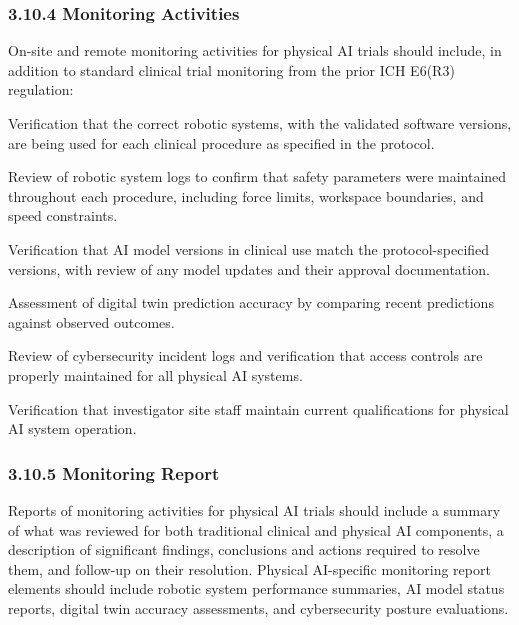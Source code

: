\subsubsection{3.10.4 Monitoring Activities}

On-site and remote monitoring activities for physical AI trials should include, in addition to standard clinical trial monitoring from the prior ICH E6(R3) regulation:

\begin{description}[leftmargin=2.5cm,style=sameline]

\item[(a)] Verification that the correct robotic systems, with the validated software versions, are being used for each clinical procedure as specified in the protocol.

\item[(b)] Review of robotic system logs to confirm that safety parameters were maintained throughout each procedure, including force limits, workspace boundaries, and speed constraints.

\item[(c)] Verification that AI model versions in clinical use match the protocol-specified versions, with review of any model updates and their approval documentation.

\item[(d)] Assessment of digital twin prediction accuracy by comparing recent predictions against observed outcomes.

\item[(e)] Review of cybersecurity incident logs and verification that access controls are properly maintained for all physical AI systems.

\item[(f)] Verification that investigator site staff maintain current qualifications for physical AI system operation.

\end{description}

\subsubsection{3.10.5 Monitoring Report}

Reports of monitoring activities for physical AI trials should include a summary of what was reviewed for both traditional clinical and physical AI components, a description of significant findings, conclusions and actions required to resolve them, and follow-up on their resolution. Physical AI-specific monitoring report elements should include robotic system performance summaries, AI model status reports, digital twin accuracy assessments, and cybersecurity posture evaluations.

